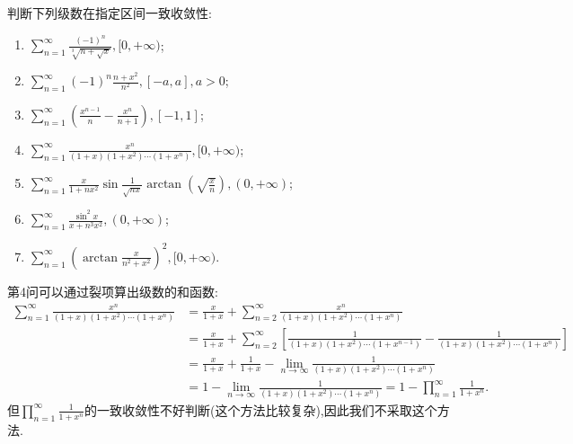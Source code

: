 \documentclass[../../main.tex]{subfiles}%
\begin{document}
\begin{example}
判断下列级数在指定区间一致收敛性:
\begin{enumerate}
\item  \(\sum_{n=1}^{\infty} \frac{(-1)^n}{\sqrt[3]{n + \sqrt{x}}}, [0, +\infty)\);

\item \(\sum_{n=1}^{\infty} (-1)^n \frac{n + x^2}{n^2}, [-a, a], a > 0\);

\item \(\sum_{n=1}^{\infty} \left( \frac{x^{n - 1}}{n} - \frac{x^n}{n + 1} \right), [-1, 1]\);

\item \(\sum_{n=1}^{\infty} \frac{x^n}{(1 + x)(1 + x^2) \cdots (1 + x^n)}, [0, +\infty)\);

\item \(\sum_{n=1}^{\infty} \frac{x}{1 + nx^2} \sin \frac{1}{\sqrt{nx}} \arctan \left( \sqrt{\frac{x}{n}} \right), (0, +\infty)\);

\item \(\sum_{n=1}^{\infty} \frac{\sin^2 x}{x + n^3 x^2}, (0, +\infty)\);

\item \(\sum_{n=1}^{\infty} \left( \arctan \frac{x}{n^2 + x^2} \right)^2, [0, +\infty)\).
\end{enumerate}
\end{example}
\begin{remark}
第4问可以通过裂项算出级数的和函数:
\begin{align*}
\sum_{n=1}^{\infty}{\frac{x^n}{(1+x)(1+x^2)\cdots (1+x^n)}}&=\frac{x}{1+x}+\sum_{n=2}^{\infty}{\frac{x^n}{(1+x)(1+x^2)\cdots (1+x^n)}}
\\
&=\frac{x}{1+x}+\sum_{n=2}^{\infty}{\left[ \frac{1}{(1+x)(1+x^2)\cdots (1+x^{n-1})}-\frac{1}{(1+x)(1+x^2)\cdots (1+x^n)} \right]}
\\
&=\frac{x}{1+x}+\frac{1}{1+x}-\underset{n\rightarrow \infty}{\lim}\frac{1}{(1+x)(1+x^2)\cdots (1+x^n)}
\\
&=1-\underset{n\rightarrow \infty}{\lim}\frac{1}{(1+x)(1+x^2)\cdots (1+x^n)}=1-\prod_{n=1}^{\infty}{\frac{1}{1+x^n}}.
\end{align*}
但$\prod_{n=1}^{\infty}{\frac{1}{1+x^n}}$的一致收敛性不好判断(这个方法比较复杂),因此我们不采取这个方法.
\end{remark}
\end{document}
